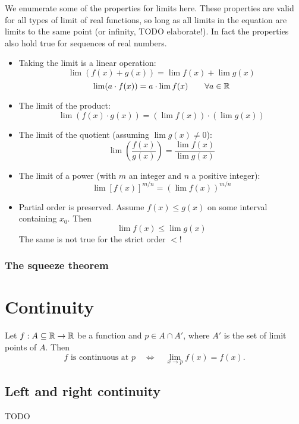 We enumerate some of the properties for limits here. These properties are valid for all types of limit of real functions, so long as all limits in the equation are limits to the same point (or infinity, TODO elaborate!).  In fact the properties also hold true for sequences of real numbers.
\begin{itemize}
\item Taking the limit is a linear operation:
\[\lim  (f(x) + g(x)) = \lim  f(x) + \lim g(x)\]
\[\lim  (a\cdot f(x)) = a\cdot \lim  f(x) \qquad \forall a \in \mathbb{R}\]
\item The limit of the product:
\[ \lim (f(x)\cdot g(x)) = \left(\lim  f(x)\right) \cdot \left(\lim  g(x)\right) \]
\item The limit of the quotient (assuming $\lim  g(x) \neq 0$):
\[ \lim \left(\frac{f(x)}{g(x)}\right) = \frac{\lim  f(x)}{\lim  g(x)}  \]
\item The limit of a power (with $m$ an integer and $n$ a positive integer):
\[ \lim  [f(x)]^{m/n} = \left(\lim  f(x)\right)^{m/n} \]
\item Partial order is preserved. Assume $f(x) \leq g(x)$ on some interval containing $x_0$. Then
\[ \lim f(x) \leq \lim g(x) \]
The same is not true for the strict order $<$!
\end{itemize}

\subsubsection{The squeeze theorem}

\section{Continuity}
\begin{proposition}
Let $f:A\subseteq\mathbb{R}\to\mathbb{R}$ be a function and $p\in A\cap A'$, where $A'$ is the set of limit points of $A$. Then
\[ \text{$f$ is continuous at $p$} \quad\iff\quad \lim_{x\to p}f(x) = f(x). \]
\end{proposition}

\subsection{Left and right continuity}
TODO

